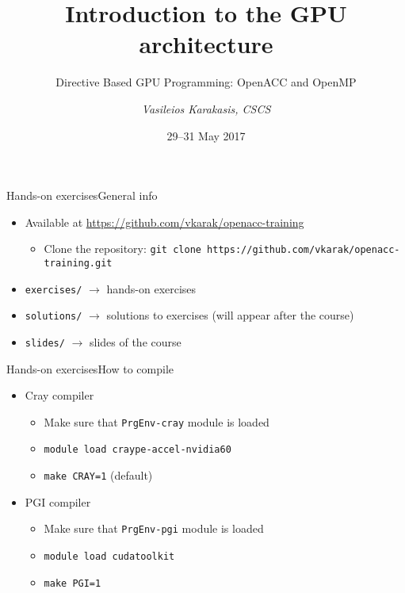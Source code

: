 \documentclass[aspectratio=169,12pt]{beamer}
\author{\emph{Vasileios Karakasis, CSCS}}
\title{Introduction to the GPU architecture}
\subtitle{Directive Based GPU Programming: OpenACC and OpenMP}
\date{29--31 May 2017}
\newcommand\shinline[2][]{\lstinline[style=shstyle,basicstyle=\ttfamily,#1]!#2!}
\begin{document}
\cscstitle

\begin{frame}[fragile]{Hands-on exercises}{General info}
  \begin{itemize}
  \item Available at \url{https://github.com/vkarak/openacc-training}
    \begin{itemize}
    \item Clone the repository: \shinline{git clone https://github.com/vkarak/openacc-training.git}
    \end{itemize}
  \item \shinline{exercises/} $\rightarrow$ hands-on exercises
  \item \shinline{solutions/} $\rightarrow$ solutions to exercises (will appear after the course)
  \item \shinline{slides/} $\rightarrow$ slides of the course
  \end{itemize}
\end{frame}

\begin{frame}[fragile]{Hands-on exercises}{How to compile}
  \begin{itemize}
  \item Cray compiler
    \begin{itemize}
    \item Make sure that \shinline{PrgEnv-cray} module is loaded
    \item \shinline{module load craype-accel-nvidia60}
    \item \shinline{make CRAY=1} (default)
    \end{itemize}
  \item PGI compiler
    \begin{itemize}
    \item Make sure that \shinline{PrgEnv-pgi} module is loaded
    \item \shinline{module load cudatoolkit}
    \item \shinline{make PGI=1}
    \end{itemize}
  \end{itemize}
\end{frame}
\end{document}
